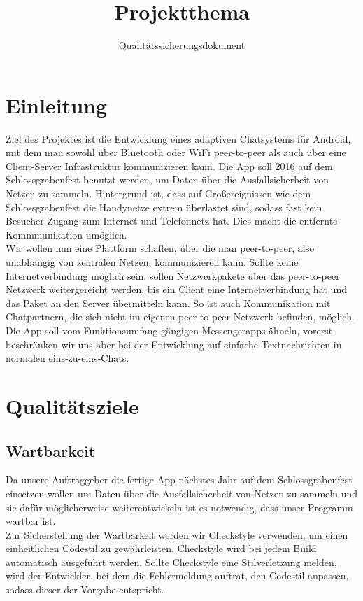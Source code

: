 \documentclass{tudreport}
\title{Projektthema}
\subtitle{Qualitätssicherungsdokument}
\begin{document}
	\maketitle
	\tableofcontents 
	
	\chapter{Einleitung}
        Ziel des Projektes ist die Entwicklung eines adaptiven Chatsystems für Android, mit dem man sowohl über Bluetooth oder WiFi peer-to-peer als auch über eine Client-Server Infrastruktur kommunizieren kann. Die App soll 2016 auf dem Schlossgrabenfest benutzt werden, um Daten über die Ausfallsicherheit von Netzen zu sammeln. Hintergrund ist, dass auf Großereignissen wie dem Schlossgrabenfest die Handynetze extrem überlastet sind, sodass fast kein Besucher Zugang zum Internet und Telefonnetz hat. Dies macht die entfernte Kommmunikation umöglich.\\

        Wir wollen nun eine Plattform schaffen, über die man peer-to-peer, also unabhängig von zentralen Netzen, kommunizieren kann. Sollte keine Internetverbindung möglich sein, sollen Netzwerkpakete über das peer-to-peer Netzwerk weitergereicht werden, bis ein Client eine Internetverbindung hat und das Paket an den Server übermitteln kann. So ist auch Kommunikation mit Chatpartnern, die sich nicht im eigenen peer-to-peer Netzwerk befinden, möglich. Die App soll vom Funktionsumfang gängigen Messengerapps ähneln, vorerst beschränken wir uns aber bei der Entwicklung auf einfache Textnachrichten in normalen eins-zu-eins-Chats.
	
	\chapter{Qualitätsziele}
        \section{Wartbarkeit}
    
		Da unsere Auftraggeber die fertige App nächstes Jahr auf dem Schlossgrabenfest einsetzen wollen um Daten über die Ausfallsicherheit von Netzen zu sammeln und sie dafür möglicherweise weiterentwickeln ist es notwendig, dass unser Programm wartbar ist.\\

		Zur Sicherstellung der Wartbarkeit werden wir Checkstyle verwenden, um einen einheitlichen Codestil zu gewährleisten.
                Checkstyle wird bei jedem Build automatisch ausgeführt werden. Sollte Checkstyle eine Stilverletzung melden, wird der Entwickler, bei dem die Fehlermeldung auftrat, den Codestil anpassen, sodass dieser der Vorgabe entspricht.\\
\end{document}
